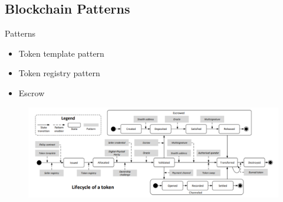 \subsection{Blockchain Patterns}
\begin{frame}{Patterns}
    \begin{itemize}
        \item Token template pattern
        \item Token registry pattern
        \item Escrow
    \end{itemize}
    \begin{figure}
        \includegraphics[height=0.5\textheight, width=\linewidth,
            keepaspectratio]{photos/token.png}
        \centering
    \end{figure}
\end{frame}
